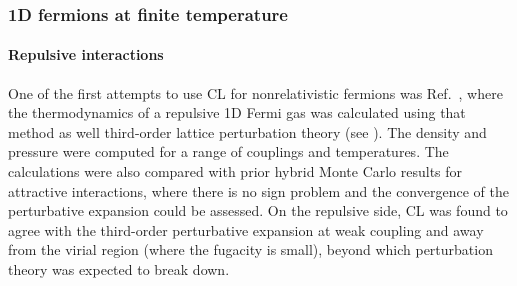 \documentclass[../main.tex]{subfiles}
\begin{document}
\subsubsection{1D fermions at finite temperature \label{sect:fermions_ft_1d}}
\paragraph{Repulsive interactions}

One of the first attempts to use CL for nonrelativistic fermions was Ref.~\cite{PRD95094502}, where the thermodynamics of a repulsive 1D Fermi gas
was calculated using that method as well third-order lattice perturbation theory (see ). The density and pressure were
computed for a range of couplings and temperatures. The calculations were also compared with prior hybrid Monte Carlo results for attractive interactions,
where there is no sign problem and the convergence of the perturbative expansion could be assessed. On the repulsive side, CL was found to agree with
the third-order perturbative expansion at weak coupling and away from the virial region (where the fugacity is small), beyond which perturbation theory was expected
to break down.
\end{document}
